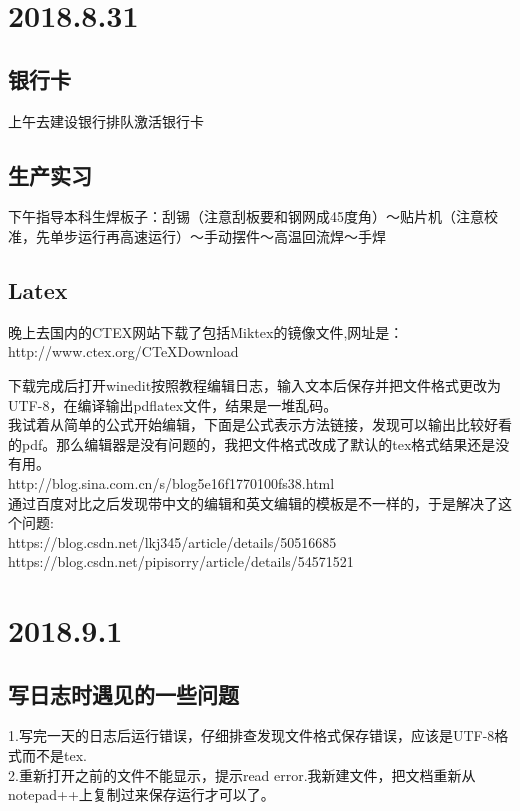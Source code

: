 \documentclass[UTF8]{ctexart}
\begin{document}
\section{2018.8.31}
\subsection{银行卡}
上午去建设银行排队激活银行卡
\subsection{生产实习}
下午指导本科生焊板子：刮锡（注意刮板要和钢网成45度角）～贴片机（注意校准，先单步运行再高速运行）～手动摆件～高温回流焊～手焊\\
\subsection{Latex}
晚上去国内的CTEX网站下载了包括Miktex的镜像文件,网址是：\\
http://www.ctex.org/CTeXDownload

下载完成后打开winedit按照教程编辑日志，输入文本后保存并把文件格式更改为UTF-8，在编译输出pdflatex文件，结果是一堆乱码。\\

我试着从简单的公式开始编辑，下面是公式表示方法链接，发现可以输出比较好看的pdf。那么编辑器是没有问题的，我把文件格式改成了默认的tex格式结果还是没有用。\\
http://blog.sina.com.cn/s/blog5e16f1770100fs38.html\\

通过百度对比之后发现带中文的编辑和英文编辑的模板是不一样的，于是解决了这个问题:\\
https://blog.csdn.net/lkj345/article/details/50516685\\
https://blog.csdn.net/pipisorry/article/details/54571521\\
\section{2018.9.1}
\subsection{写日志时遇见的一些问题}
1.写完一天的日志后运行错误，仔细排查发现文件格式保存错误，应该是UTF-8格式而不是tex.\\

2.重新打开之前的文件不能显示，提示read error.我新建文件，把文档重新从notepad++上复制过来保存运行才可以了。\\
\end{document}

